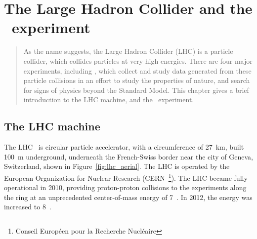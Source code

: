 \chapter[The LHC and the \atlas\ experiment][The LHC and \atlas]
        {The Large Hadron Collider and the \atlas\ experiment}
\label{ch:lhc}

\begin{quote}
  As the name suggests, the Large Hadron Collider (LHC) is a particle collider,
  which collides particles at very high energies.
  There are four major experiments, including \atlas, which collect and study
  data generated from these particle collisions in an effort to study
  the properties of nature, and search for signs of physics beyond the Standard
  Model.
  This chapter gives a brief introduction to the LHC machine, and the
  \atlas\ experiment.
\end{quote}

\FloatBarrier
\section{The LHC machine}
\label{sec:lhc}

The LHC~\cite{cern-jinst-lhc} is circular particle accelerator, with a
circumference of 27~km, built 100~m underground, underneath the French-Swiss
border near the city of Geneva, Switzerland, shown in
Figure~\ref{fig:lhc_aerial}.
The LHC is operated by the European Organization for Nuclear Research
(CERN~\footnote{Conseil Europ\'een pour la Recherche Nucl\'eaire}).
The LHC became fully operational in 2010, providing proton-proton collisions
to the experiments along the ring at an unprecedented center-of-mass energy
of 7~\TeV.
In 2012, the energy was increased to 8~\TeV.

